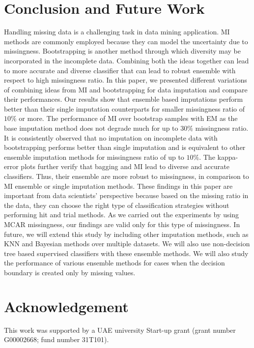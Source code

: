 \documentclass{iosart2c}
\begin{document}
\section{Conclusion and Future Work}
\label{sec:conclusion}
Handling missing data is a challenging task in data mining application. MI methods are commonly employed because they can model the uncertainty due to missingness. Bootstrapping is another method through which diversity may be incorporated in the incomplete data. Combining both the ideas together can lead to more accurate and diverse classifier that can lead to robust ensemble with respect to high missingness ratio. In this paper, we presented different variations of combining ideas from MI and bootstrapping for data imputation and compare their performances. Our results show that ensemble based imputations perform better than their single imputation counterparts for smaller missingness ratio of $10\%$ or more. The performance of MI over bootstrap samples with EM as the base imputation method does not degrade much for up to $30\%$ missingness ratio. It is consistently observed that no imputation on incomplete data with bootstrapping performs better than single imputation and is equivalent to other ensemble imputation methods for missingness ratio of up to $10\%$. The kappa-error plots further verify that bagging and MI lead to diverse and accurate classifiers. Thus, their ensemble are more robust to missingness, in comparison to MI ensemble or single imputation methods. These findings in this paper are important from data scientists' perspective because based on the missing ratio in the data, they can choose the right type of classification strategies without performing hit and trial methods. As we carried out the experiments  by using MCAR missingness, our findings are valid only for this type of  missingness.  In future, we will extend this study by including other imputation methods, such as KNN and Bayesian methods over multiple datasets. We will also use non-decision tree based supervised classifiers with these ensemble methods. We will also study the performance of various ensemble methods for cases when the decision boundary is created only by missing values. 
\section{Acknowledgement} This work was supported by a UAE university Start-up grant (grant number G00002668; fund number 31T101).

%


\end{document}
